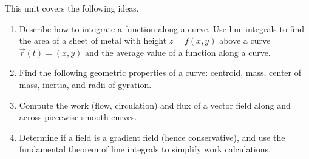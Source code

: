 \newcommand{\sagephysicalpropertiesthreed}{http://bmw.byuimath.com/dokuwiki/doku.php?id=physical_properties_in_3d}




\noindent 
This unit covers the following ideas. %
\begin{enumerate}
\item Describe how to integrate a function along a curve. Use line integrals to find the area of a sheet of metal with height $z=f(x,y)$ above a curve $\vec r(t)=\left(x,y\right)$ and the average value of a function along a curve.
\item Find the following geometric properties of a curve: centroid, mass, center of mass, inertia, and radii of gyration.
\item Compute the work (flow, circulation) and flux of a vector field along and across piecewise smooth curves.
\item Determine if a field is a gradient field (hence conservative), and use the fundamental theorem of line integrals to simplify work calculations.
\end{enumerate}
\vskip0.1in

